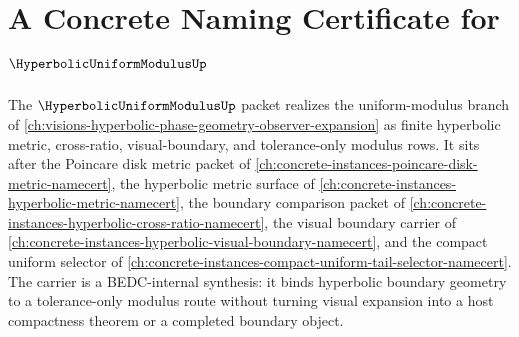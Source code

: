 \chapter{A Concrete Naming Certificate for $\HyperbolicUniformModulusUp$}
\label{ch:concrete-instances-hyperbolic-uniform-modulus-namecert}

The $\HyperbolicUniformModulusUp$ packet realizes the uniform-modulus branch of \autoref{ch:visions-hyperbolic-phase-geometry-observer-expansion} as finite hyperbolic metric, cross-ratio, visual-boundary, and tolerance-only modulus rows. It sits after the Poincare disk metric packet of \autoref{ch:concrete-instances-poincare-disk-metric-namecert}, the hyperbolic metric surface of \autoref{ch:concrete-instances-hyperbolic-metric-namecert}, the boundary comparison packet of \autoref{ch:concrete-instances-hyperbolic-cross-ratio-namecert}, the visual boundary carrier of \autoref{ch:concrete-instances-hyperbolic-visual-boundary-namecert}, and the compact uniform selector of \autoref{ch:concrete-instances-compact-uniform-tail-selector-namecert}. The carrier is a BEDC-internal synthesis: it binds hyperbolic boundary geometry to a tolerance-only modulus route without turning visual expansion into a host compactness theorem or a completed boundary object.

